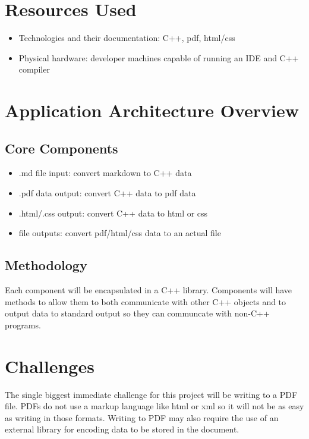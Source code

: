 \documentclass[12pt]{article}
\begin{document}
\section{Resources Used}
\begin{itemize}
	\item Technologies and their documentation: C++, pdf, html/css
	\item Physical hardware: developer machines capable of running an IDE and C++ compiler
\end{itemize}
\section{Application Architecture Overview}
	\subsection{Core Components}
		\begin{itemize}
			\item .md file input: convert markdown to C++ data
			\item .pdf data output: convert C++ data to pdf data
			\item .html/.css output: convert C++ data to html or css
			\item file outputs: convert pdf/html/css data to an actual file
		\end{itemize}
	\subsection{Methodology}
		Each component will be encapsulated in a C++ library. Components will have methods to allow them to both communicate with other C++ objects and to output data to standard output so they can communcate with non-C++ programs.
\section{Challenges}
The single biggest immediate challenge for this project will be writing to a PDF file. PDFs do not use a markup language like html or xml so it will not be as easy as writing in those formats. Writing to PDF may also require the use of an external library for encoding data to be stored in the document.
\end{document}
